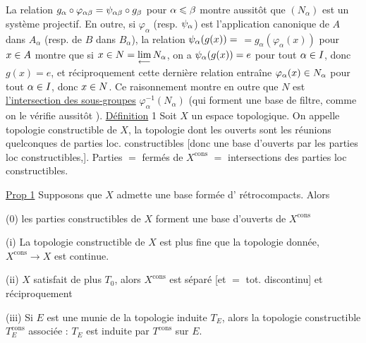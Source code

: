 La relation $g_\alpha\circ\varphi_{\alpha\beta}=\psi_{\alpha\beta}\circ g_{\beta}$ pour $\alpha\leqslant\beta$ montre aussitôt que
$(N_\alpha)$ est un système projectif. En outre, si $\varphi_\alpha$ (resp. $\psi_\alpha$) est l'application
canonique de $A$ dans $A_\alpha$ (resp. de $B$ dans $B_\alpha$), la relation $\psi_\alpha(g(x))=$
$=g_\alpha(\varphi_\alpha(x))$ pour $x\in A$ montre que si $x\in N=\underset{\longleftarrow}{\lim}\,N_\alpha$, on a $\psi_\alpha(g(x))=e$
pour tout $\alpha\in I$, donc $g(x)=e$, et réciproquement cette dernière relation
entraîne $\varphi_\alpha(x)\in N_\alpha$ pour tout $\alpha\in I$, donc $x\in N$. Ce raisonnement montre
en outre que $N$ est \uline{l'intersection des sous-groupes} $\varphi^{-1}_\alpha(N_\alpha)$ (qui forment
une base de filtre, comme on le vérifie aussitôt ).
\uline{Définition} 1 Soit $X$ un espace topologique. On appelle topologie constructible de $X$,  la topologie dont les ouverts sont les réunions quelconques de parties loc. constructibles [donc une base d'ouverts  par les parties loc constructibles,]. Parties  $=$ fermés de $X^{\mathrm{cons}}$ $=$ intersections des parties loc constructibles.

\uline{Prop 1} Supposons que  $X$ admette une base  formée d' rétrocompacts. Alors

(0) les parties constructibles de $X$ forment une base d'ouverts de $X^{\mathrm{cons}}$

(i) La topologie constructible de $X$ est plus fine que la topologie donnée,  $X^{\mathrm{cons}}\longrightarrow X$ est continue.

(ii)   $X$ satisfait de plus $T_0$, alors $X^{\mathrm{cons}}$ est séparé [et $=$ tot. discontinu] et réciproquement

(iii) Si  $E$ est une   munie de la topologie induite $T_E$, alors la topologie constructible $T_E^{\mathrm{cons}}$ associée : $T_E$ est induite par $T^{\mathrm{cons}}$ sur $E$.

